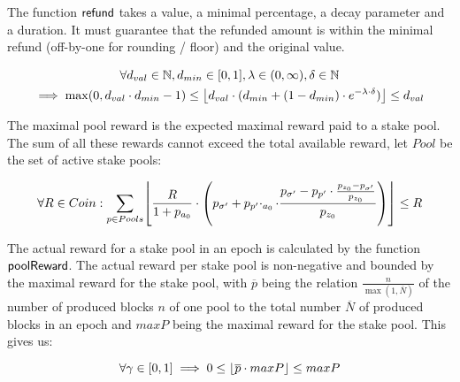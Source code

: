 \begin{property}
  \label{prop:minimal-refund}

  The function $\fun{refund}$ takes a value, a minimal percentage, a decay
  parameter and a duration. It must guarantee that the refunded amount is within
  the minimal refund (off-by-one for rounding / floor) and the original value.

  \begin{multline*}
    \forall d_{val} \in \mathbb{N}, d_{min} \in [0,1], \lambda \in (0, \infty),
    \delta \in \mathbb{N} \\
    \implies \max(0,d_{val}\cdot d_{min} - 1) \leq \floor*{d_{val}\cdot(d_{min} +
      (1-d_{min})\cdot e^{-\lambda\cdot\delta})} \leq d_{val}
  \end{multline*}
\end{property}

\begin{property}
  \label{prop:maximal-pool-reward}

  The maximal pool reward is the expected maximal reward paid to a stake
  pool. The sum of all these rewards cannot exceed the total available reward,
  let $Pool$ be the set of active stake pools:

  \begin{equation*}
    \forall R \in Coin:\sum_{p \in Pools} \floor*{\frac{R}{1+p_{a_{0}}}\cdot
      \left(
        p_{\sigma'}+p_{p'}\cdotp_{a_{0}}\cdot\frac{p_{\sigma'}-p_{p'}\cdot\frac{p_{z_{0}}-p_{\sigma'}}{p_{z_{0}}}}{p_{z_{0}}}
      \right)}\leq R
  \end{equation*}
\end{property}

\begin{property}
  \label{prop:actual-reward}

  The actual reward for a stake pool in an epoch is calculated by the function
  $\fun{poolReward}$. The actual reward per stake pool is non-negative and
  bounded by the maximal reward for the stake pool, with $\overline{p}$ being
  the relation $\frac{n}{\max(1, \overline{N})}$ of the number of produced
  blocks $n$ of one pool to the total number $\overline{N}$ of produced blocks
  in an epoch and $maxP$ being the maximal reward for the stake pool. This gives
  us:

  \begin{equation*}
    \forall \gamma \in [0,1] \implies 0\leq \floor*{\overline{p}\cdot maxP} \leq maxP
  \end{equation*}
\end{property}

